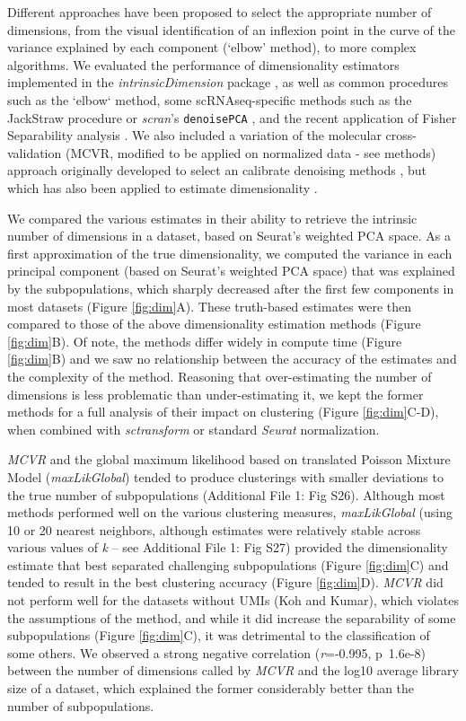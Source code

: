 \documentclass{bmcart}
\begin{document}
Different approaches have been proposed to select the appropriate number of dimensions, from the visual identification of an inflexion point in the curve of the variance explained by each component (`elbow' method), to more complex algorithms. We evaluated the performance of dimensionality estimators implemented in the \textit{intrinsicDimension} package \cite{johnssonDimensionality2015}, as well as common procedures such as the `elbow` method, some scRNAseq-specific methods such as the JackStraw procedure \cite{ChungJackstraw2015} or \textit{scran}'s \texttt{denoisePCA} \cite{LunScran2016}, and the recent application of Fisher Separability analysis \cite{AlberganteSepar2019}. We also included a variation of the molecular cross-validation (MCVR, modified to be applied on normalized data - see methods) approach originally developed to select an calibrate denoising methods \cite{batsonMolecularCrossValidationSingleCell2019}, but which has also been applied to estimate dimensionality \citep{wagnerMonetOpensource2020}.

We compared the various estimates in their ability to retrieve the intrinsic number of dimensions in a dataset, based on Seurat's weighted PCA space. As a first approximation of the true dimensionality, we computed the variance in each principal component (based on Seurat's weighted PCA space) that was explained by the subpopulations, which sharply decreased after the first few components in most datasets (Figure \ref{fig:dim}A). These truth-based estimates were then compared to those of the above dimensionality estimation methods (Figure \ref{fig:dim}B). Of note, the methods differ widely in compute time (Figure \ref{fig:dim}B) and we saw no relationship between the accuracy of the estimates and the complexity of the method. Reasoning that over-estimating the number of dimensions is less problematic than under-estimating it, we kept the former methods for a full analysis of their impact on clustering (Figure \ref{fig:dim}C-D), when combined with \textit{sctransform} or standard \textit{Seurat} normalization. 

\textit{MCVR} and the global maximum likelihood based on translated Poisson Mixture Model (\textit{maxLikGlobal}) tended to produce clusterings with smaller deviations to the true number of subpopulations (Additional File 1: Fig S26). Although most methods performed well on the various clustering measures, \textit{maxLikGlobal} (using 10 or 20 nearest neighbors, although estimates were relatively stable across various values of \textit{k} -- see Additional File 1: Fig S27) provided the dimensionality estimate that best separated challenging subpopulations (Figure \ref{fig:dim}C) and tended to result in the best clustering accuracy (Figure \ref{fig:dim}D). \textit{MCVR} did not perform well for the datasets without UMIs (Koh and Kumar), which violates the assumptions of the method, and while it did increase the separability of some subpopulations (Figure \ref{fig:dim}C), it was detrimental to the classification of some others. We observed a strong negative correlation (\textit{r}=-0.995, p~1.6e-8) between the number of dimensions called by \textit{MCVR} and the log10 average library size of a dataset, which explained the former considerably better than the number of subpopulations.
\end{document}
